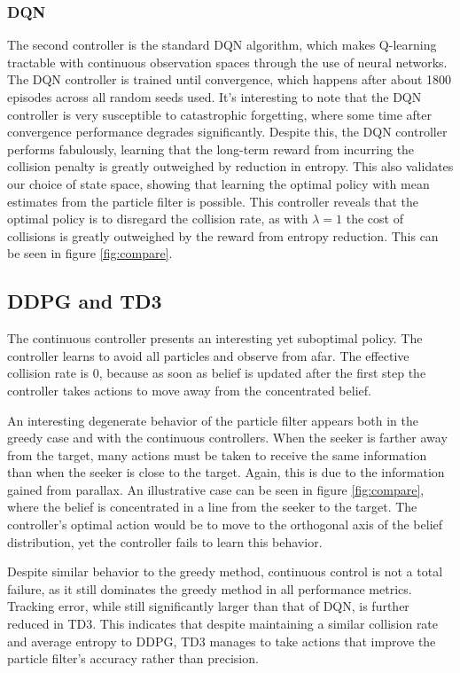 \documentclass[10pt,twocolumn,letterpaper]{article}
\begin{document}
\subsubsection{DQN}
The second controller is the standard DQN algorithm, which makes Q-learning tractable with continuous observation spaces through the use of neural networks.
The DQN controller is trained until convergence, which happens after about 1800 episodes across all random seeds used.
It's interesting to note that the DQN controller is very susceptible to catastrophic forgetting, where some time after convergence performance degrades significantly.
Despite this, the DQN controller performs fabulously, learning that the long-term reward from incurring the collision penalty is greatly outweighed by reduction in entropy. 
This also validates our choice of state space, showing that learning the optimal policy with mean estimates from the particle filter is possible.
This controller reveals that the optimal policy is to disregard the collision rate, as with $\lambda = 1$ the cost of collisions is greatly outweighed by the reward from entropy reduction.
This can be seen in figure \ref{fig:compare}.

\subsection{DDPG and TD3}
The continuous controller presents an interesting yet suboptimal policy.
The controller learns to avoid all particles and observe from afar.
The effective collision rate is 0, because as soon as belief is updated after the first step the controller takes actions to move away from the concentrated belief.

An interesting degenerate behavior of the particle filter appears both in the greedy case and with the continuous controllers.
When the seeker is farther away from the target, many actions must be taken to receive the same information than when the seeker is close to the target.
Again, this is due to the information gained from parallax.
An illustrative case can be seen in figure \ref{fig:compare}, where the belief is concentrated in a line from the seeker to the target.
The controller's optimal action would be to move to the orthogonal axis of the belief distribution, yet the controller fails to learn this behavior.

Despite similar behavior to the greedy method, continuous control is not a total failure, as it still dominates the greedy method in all performance metrics.
Tracking error, while still significantly larger than that of DQN, is further reduced in TD3. 
This indicates that despite maintaining a similar collision rate and average entropy to DDPG, TD3 manages to take actions that improve the particle filter's accuracy rather than precision.
\end{document}
